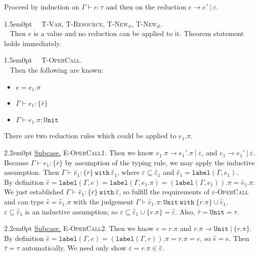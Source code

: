 \documentclass{llncs}
\newcommand{\keywadj}[1]{\mathtt{#1}}
\newcommand{\keyw}[1]{\keywadj{#1}~}
\newcommand{\proofcase}[2]{
	\begin{adjustwidth}{1.5em}{0pt}
		\fbox{Case.}~~#1. \\ ~#2
	\end{adjustwidth}
}
\newcommand{\subcase}[1] {
	\begin{adjustwidth}{2.2em}{0pt}
		\underline{Subcase.} #1
	\end{adjustwidth}
}
\newcommand{\type}[2]{
	#1~\keyw{with} #2
}
\begin{document}
{Proceed by induction on $\Gamma \vdash e : \tau$ and then on the reduction $e \longrightarrow e'~|~\varepsilon$.\\

\proofcase{\textsc{T-Var}, \textsc{T-Resource}, \textsc{T-New$_\sigma$}, \textsc{T-New$_d$}}{
Then $e$ is a value and no reduction can be applied to it. Theorem statement holds immediately.\\
}


\proofcase{\textsc{T-OperCall}}{
Then the following are known:
\begin{itemize}
	\item $e = e_1.\pi$
	\item $\Gamma \vdash e_1 : \{ \bar r \}$
	\item $\Gamma \vdash e_1.\pi : \keywadj{Unit}$
\end{itemize}
There are two reduction rules which could be applied to $e_1.\pi$.\\

	\subcase{\textsc{E-OperCall1}.
		Then we know $e_1.\pi \longrightarrow e_1'.\pi~|~\varepsilon$, and $e_1 \rightarrow e_1'~|~\varepsilon$. Because $\Gamma \vdash e_1 : \{ \bar r \}$ by assumption of the typing rule, we may apply the inductive assumption. Then $\Gamma \vdash \hat e_1 : \type{\{ \bar r \}}{\hat \varepsilon_1$, where $\varepsilon \subseteq \hat \varepsilon_1$ and $\hat e_1 = \keywadj{label}(\Gamma, e_1)$.\\

\noindent
By definition $\hat e = \keywadj{label}(\Gamma, e) = \keywadj{label}(\Gamma, e_1.\pi) = (\keywadj{label}(\Gamma, e_1)).\pi = \hat e_1.\pi$. We just established $\Gamma \vdash \hat e_1 : \type{\{ \bar r \}}{\hat \varepsilon}$, so fulfill the requirements of \textsc{$\varepsilon$-OperCall} and can type $\hat e = \hat e_1.\pi$ with the judgement $\Gamma \vdash \hat e_1.\pi : \type{\keywadj{Unit}}{\{ r.\pi \} \cup \hat \varepsilon_1}$. \\

\noindent
$\varepsilon \subseteq \hat \varepsilon_1$ is an inductive assumption; so $\varepsilon \subseteq \hat \varepsilon_1 \cup \{ r.\pi \} = \hat \varepsilon$. Also, $\hat \tau = \keywadj{Unit} = \tau$.\\
		}
	}
	
	\subcase{\textsc{E-OperCall2}.
		Then we know $e = r.\pi$ and $r.\pi \longrightarrow \keywadj{Unit}~|~\{ r.\pi \}$. By definition $\hat e = \keywadj{label}(\Gamma, e) = (\keywadj{label}(\Gamma, r)).\pi = r.\pi = e$, so $\hat e = e$. Then $\hat \tau = \tau$ automatically. We need only show $\varepsilon = r.\pi \in \hat \varepsilon$.\\
		
}}}
\end{document}
